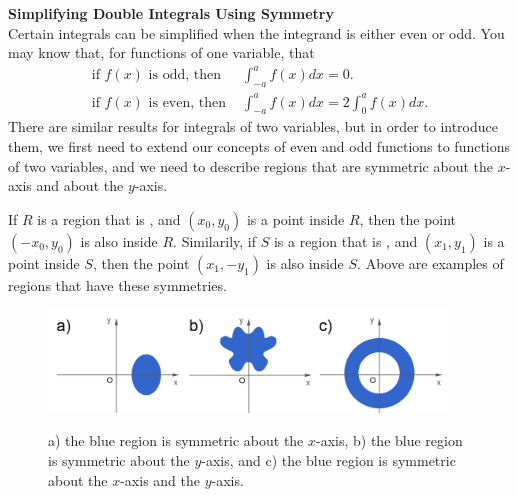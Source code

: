 \item %
\textbf{Simplifying Double Integrals Using Symmetry} \\
Certain integrals can be simplified when the integrand is either even or odd. You may know that, for functions of one variable, that
\begin{align*}
  \text{if }f(x)\text{ is odd, then } & \int_{-a}^{a} f(x) dx = 0 . \\
  \text{if }f(x)\text{ is even, then } & \int_{-a}^{a} f(x) dx = 2 \int_0^a f(x) dx.
\end{align*}
There are similar results for integrals of two variables, but in order to introduce them, we first need to extend our concepts of even and odd functions to functions of two variables, and we need to describe regions that are symmetric about the $x$-axis and about the $y$-axis. 

If $R$ is a region that is , and $(x_0,y_0)$ is a point inside $R$, then the point $(-x_0,y_0)$ is also inside $R$. Similarily, if $S$ is a region that is , and $(x_1,y_1)$ is a point inside $S$, then the point $(x_1,-y_1)$ is also inside $S$. Above are examples of regions that have these symmetries.\\

\begin{figure}[h]
  \vspace{-1pt}
  \begin{center}
    \includegraphics[width=0.95\textwidth]{ImgRegions.jpg}
  \end{center}
 \begin{quote} \caption{\small{a) the blue region is symmetric about the $x$-axis, b) the blue region is symmetric about the $y$-axis, and c) the blue region is symmetric about the $x$-axis and the $y$-axis.}}\end{quote}
\end{figure}


